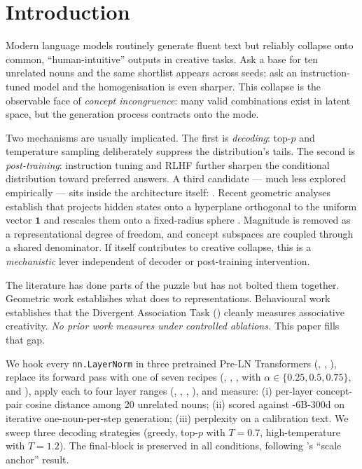 \section{Introduction}
\label{sec:intro}

Modern language models routinely generate fluent text but reliably collapse
onto common, ``human-intuitive'' outputs in creative tasks. Ask a base
\gptsmall for ten unrelated nouns and the same shortlist appears across
seeds; ask an instruction-tuned model and the homogenisation is even
sharper. This collapse is the observable face of \emph{concept incongruence}:
many valid combinations exist in latent space, but the generation process
contracts onto the mode.

Two mechanisms are usually implicated. The first is \emph{decoding}: top-$p$
and temperature sampling deliberately suppress the distribution's tails. The
second is \emph{post-training}: instruction tuning and RLHF further sharpen
the conditional distribution toward preferred answers. A third candidate ---
much less explored empirically --- sits inside the architecture itself:
\layernorm. Recent geometric analyses establish that \layernorm projects
hidden states onto a hyperplane orthogonal to the uniform vector $\bm{1}$
and rescales them onto a fixed-radius sphere
\citep{brody2023expressivity,gupta2024geometric,menary2024transformer}.
Magnitude is removed as a representational degree of freedom, and concept
subspaces are coupled through a shared denominator. If \layernorm itself
contributes to creative collapse, this is a \emph{mechanistic} lever
independent of decoder or post-training intervention.

The literature has done parts of the puzzle but has not bolted them
together. Geometric work
\citep{brody2023expressivity,gupta2024geometric,menary2024transformer}
establishes what \layernorm does to representations. Behavioural work
\citep{olson2021naming,chen2023probing,bellemare2024divergent,nagarajan2025roll}
establishes that the Divergent Association Task (\dat) cleanly measures
associative creativity. \emph{No prior work measures \dat under controlled
\layernorm ablations.} This paper fills that gap.

We hook every \verb|nn.LayerNorm| in three pretrained Pre-LN Transformers
(\gptsmall, \gptmedium, \pythia), replace its forward pass with one of
seven recipes (\stockln, \nomean, \noaffine, \weakened with
$\alpha\in\{0.25,0.5,0.75\}$, and \identityln), apply each to four layer
ranges (\tgtall, \tgtearly, \tgtmid, \tgtlate), and measure: (i) per-layer
concept-pair cosine distance among 20 unrelated nouns; (ii) \dat scored
against \glove-6B-300d on iterative one-noun-per-step generation; (iii)
perplexity on a calibration text. We sweep three decoding strategies
(greedy, top-$p$ with $T{=}0.7$, high-temperature with $T{=}1.2$). The
final-block \layernorm is preserved in all conditions, following
\citet{kanavalau2026taper}'s ``scale anchor'' result.

